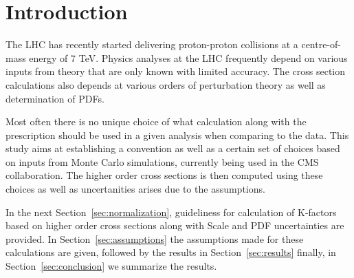 \section{Introduction}
\label{sec:intro}
The LHC has recently started delivering proton-proton collisions at a centre-of-mass energy of 7 TeV. 
Physics analyses at the LHC frequently depend on various inputs from theory that are only known with
limited accuracy. The cross section calculations also depends at various orders of perturbation theory
as well as determination of PDFs. 

Most often there is no unique choice of what calculation along with the prescription should be used in 
a given analysis when comparing to the data. This study aims at establishing a convention as well 
as a certain set of choices based on inputs from Monte Carlo simulations, currently being used in the 
CMS collaboration. The higher order cross sections is then computed using these choices as well as 
uncertanities arises due to the assumptions.

In the next Section~\ref{sec:normalization}, guideliness for calculation of K-factors based on higher order cross sections
along with Scale and PDF uncertainties are provided. In Section~\ref{sec:assumptions}
the assumptions made for these calculations are given, followed by the results in Section~\ref{sec:results}
finally, in Section~\ref{sec:conclusion} we summarize the results.  
